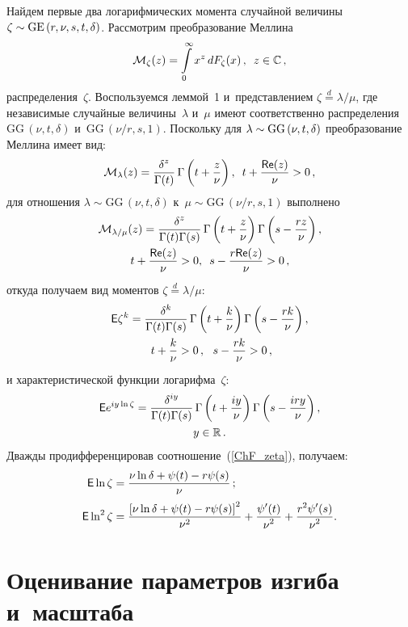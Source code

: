 \begin{multicols}{2}
Найдем первые два логарифмических момента случайной величины $\zeta\hm\sim 
\mathrm{GE}\,(r,\nu,s,t,\delta)$. Рас\-смот\-рим преобразование Меллина
$$
\mathcal{M}_\zeta(z) = \int\limits_{0}^{\infty}x^z \, dF_\zeta(x)\,,\enskip 
z\in\mathbb{C}\,,
$$
распределения~$\zeta$. Воспользуемся леммой~1 и~представлением 
$\zeta\stackrel{d}{=}\lambda/\mu$, где независимые случайные величины~$\lambda$ 
и~$\mu$ имеют соответственно распределения $\mathrm{GG}\,(\nu,t,\delta)$ и~$\mathrm{GG}\,(\nu/r,s,1)$.
Поскольку для $\lambda\hm\sim \mathrm{GG}\,(\nu,t,\delta)$ преобразование Меллина имеет вид:
$$
\mathcal{M}_\lambda(z) = 
\displaystyle\frac{\displaystyle \delta^z\mathstrut}{\displaystyle \Gamma(t)\mathstrut}\,\Gamma\left(t+\displaystyle\frac{\displaystyle z\mathstrut}{\displaystyle \nu\mathstrut}\right), \enskip
 t+\displaystyle\frac{\displaystyle {\sf Re}  (z)\mathstrut}{\displaystyle \nu\mathstrut}>0\,,
 $$
для отношения $\lambda\sim \mathrm{GG}\,(\nu,t,\delta)$ к~$\mu\sim 
\mathrm{GG}\,(\nu/r,s,1)$ 
выполнено
\begin{multline*}
\mathcal{M}_{\lambda/\mu}(z) = 
\displaystyle\frac{\displaystyle \delta^z\mathstrut}{\displaystyle \Gamma(t)\Gamma(s)\mathstrut}\,\Gamma\left(t+\displaystyle\frac{\displaystyle z\mathstrut}{\displaystyle \nu\mathstrut}\right)\Gamma\left
(s-\displaystyle\frac{\displaystyle rz\mathstrut}{\displaystyle \nu\mathstrut}\right), \\
 t+\displaystyle\frac{\displaystyle {\sf Re} (z)\mathstrut}{\displaystyle \nu\mathstrut}>0, \enskip
 s-\displaystyle\frac{\displaystyle r{\sf Re}  (z)\mathstrut}{\displaystyle \nu\mathstrut}>0\,,
\end{multline*}
откуда получаем вид моментов $\zeta\stackrel{d}{=}\lambda/\mu$:
\begin{multline}
\label{moments_zeta}
\e \zeta^k = 
\fr{\delta^{k}}{\Gamma(t)\Gamma(s)}\,\Gamma\left(t+\fr{k}{\nu}\right)\Gamma
\left(s-\fr{rk}{\nu}\right), \\
 \ t+\fr{k}{\nu}>0\,, \ \ s-\fr{rk}{\nu}>0\,,
\end{multline}
и характеристической функции логарифма~$\zeta$:
\begin{multline}
\label{ChF_zeta}
\e e^{iy\ln\zeta}= 
\fr{\delta^{iy}}{\Gamma(t)\Gamma(s)}\,\Gamma\left(t+\fr{iy}{\nu}\right)\Gamma
\left( s-\fr{iry}{\nu}\right), \\
 y\in\mathbb{R}\,.
\end{multline}
Дважды продифференцировав соотношение~(\ref{ChF_zeta}), получаем:
\begin{align*}
{\sf E}\ln\zeta&=\displaystyle\frac{\displaystyle \nu\ln\delta+\psi(t)-r\psi(s)\mathstrut}{\displaystyle \nu\mathstrut}\,;
\\
{\sf E}\ln^2\zeta&=
\frac{\left[\nu\ln\delta+\psi(t)-
r\psi(s)\right]^2}{\nu^2}+\displaystyle\frac{\displaystyle \psi'(t)\mathstrut}{\displaystyle \nu^2\mathstrut}+\displaystyle\frac{\displaystyle r^2\psi'(s)\mathstrut}{\displaystyle \nu^2\mathstrut}.
\end{align*}

\section{Оценивание параметров изгиба и~масштаба}


\end{multicols}
